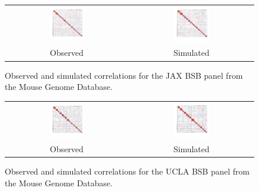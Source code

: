 \documentclass{article}
\begin{document}
\begin{figure}[htp]
  \begin{center}
    \begin{tabular}{cc}
      \includegraphics[width = 0.300\textwidth]{./img/jaxbsb.png} &
      \includegraphics[width = 0.300\textwidth]{./img/jaxbsb_sim.png} \\
      {\footnotesize Observed} &
      {\footnotesize Simulated}
    \end{tabular}
  \end{center}
  \caption{Observed and simulated correlations for the JAX BSB panel from the Mouse Genome Database.}
  \label{fig:jaxbsb}
\end{figure}


\begin{figure}[htp]
  \begin{center}
    \begin{tabular}{cc}
      \includegraphics[width = 0.300\textwidth]{./img/uclabsb.png} &
      \includegraphics[width = 0.300\textwidth]{./img/uclabsb_sim.png} \\
      {\footnotesize Observed} &
      {\footnotesize Simulated}
    \end{tabular}
  \end{center}
  \caption{Observed and simulated correlations for the UCLA BSB panel from the Mouse Genome Database.}
  \label{fig:uclabsb}
\end{figure}
\end{document}
